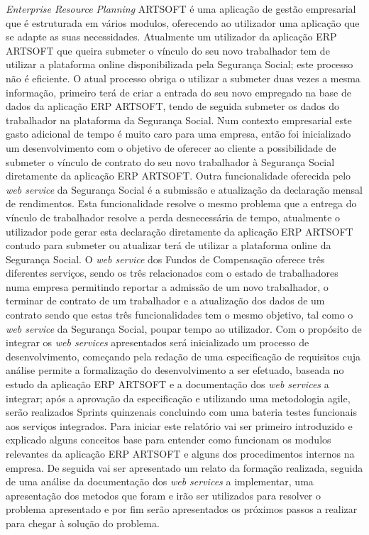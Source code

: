 \documentclass[sigplan]{acmart}
\begin{document}
\textit{Enterprise Resource Planning} ARTSOFT é uma aplicação de gestão empresarial que é estruturada em vários modulos, oferecendo ao utilizador uma aplicação que se adapte as suas necessidades. Atualmente um utilizador da aplicação ERP ARTSOFT que queira submeter o vínculo do seu novo trabalhador tem de utilizar a plataforma online disponibilizada pela Segurança Social; este processo não é eficiente. O atual processo obriga o utilizar a submeter duas vezes a mesma informação, primeiro terá de criar a entrada do seu novo empregado na base de dados da aplicação ERP ARTSOFT, tendo de seguida submeter os dados do trabalhador na plataforma da Segurança Social. Num contexto empresarial este gasto adicional de tempo é muito caro para uma empresa, então foi inicializado um desenvolvimento com o objetivo de oferecer ao cliente a possibilidade de submeter o vínculo de contrato do seu novo trabalhador à Segurança Social diretamente da aplicação ERP ARTSOFT. Outra funcionalidade oferecida pelo \textit{web service} da Segurança Social é a submissão e atualização da declaração mensal de rendimentos. Esta funcionalidade resolve o mesmo problema que a entrega do vínculo de trabalhador resolve a perda desnecessária de tempo, atualmente o utilizador pode gerar esta declaração diretamente da aplicação ERP ARTSOFT contudo para submeter ou atualizar terá de utilizar a plataforma online da Segurança Social. O \textit{web service} dos Fundos de Compensação oferece três diferentes serviços, sendo os três relacionados com o estado de trabalhadores numa empresa permitindo reportar a admissão de um novo trabalhador, o terminar de contrato de um trabalhador e a atualização dos dados de um contrato sendo que estas três funcionalidades tem o mesmo objetivo, tal como o \textit{web service} da Segurança Social, poupar tempo ao utilizador. Com o propósito de integrar os \textit{web services} apresentados será inicializado um processo de desenvolvimento, começando pela redação de uma especificação de requisitos cuja análise permite a formalização do desenvolvimento a ser efetuado, baseada no estudo da aplicação ERP ARTSOFT e a documentação dos \textit{web services} a integrar; após a aprovação da especificação e utilizando uma metodologia agile, serão realizados Sprints quinzenais concluindo com uma bateria testes funcionais aos serviços integrados. Para iniciar este relatório vai ser primeiro introduzido e explicado alguns conceitos base para entender como funcionam os modulos relevantes da aplicação ERP ARTSOFT e alguns dos procedimentos internos na empresa. De seguida vai ser apresentado um relato da formação realizada, seguida de uma análise da documentação dos \textit{web services} a implementar, uma apresentação dos metodos que foram e irão ser utilizados para resolver o problema apresentado e por fim serão apresentados os próximos passos a realizar para chegar à solução do problema.
\end{document}
